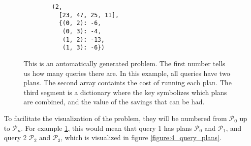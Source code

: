\begin{figure}[!h]
    \centering
    \begin{verbatim}
        (2,
          [23, 47, 25, 11],
          {(0, 2): -6,
           (0, 3): -4,
           (1, 2): -13,
           (1, 3): -6})
    \end{verbatim}
    \caption{This is an automatically generated problem. The first number tells us how many queries there are. In this example, all queries have two plans. The second array containts the cost of running each plan. The third segment is a dictionary where the key symbolizes which plans are combined, and the value of the savings that can be had.}
    \label{figure:2d_problem_data}
\end{figure}

To facilitate the visualization of the problem, they will be numbered from $\mathcal{P}_0$ up to $\mathcal{P}_n$. For example \ref{figure:2d_problem_data}, this would mean that query 1 has plans $\mathcal{P}_0$ and $\mathcal{P}_1$, and query 2 $\mathcal{P}_2$ and $\mathcal{P}_3$, which is visualized in figure \ref{figure:4_query_plans}.

